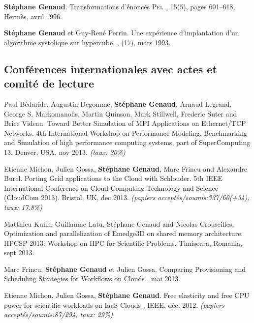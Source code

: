 \documentclass[11pt]{article}
\begin{document}
\begin{thebibliography}{99}
\textbf{Stéphane Genaud}.
\newblock Transformations d'énoncés \textsc{Pei}.
, 15(5), pages 601--618, 
Hermès, avril 1996.

\textbf{Stéphane Genaud} et Guy-René Perrin.
\newblock Une expérience d'implantation d'un algorithme systolique sur
  hypercube.
,
  (17), mars 1993.


\subsection*{Conférences internationales avec actes et comité de lecture}


  Paul  Bédaride,  Augustin Degomme,  \textbf{Stéphane  Genaud},
  Arnaud  Legrand,  George  S.  Markomanolis, Martin  Quinson,  Mark  Stillwell,
  Frederic Suter  and Brice Videau.   
\newblock Toward Better Simulation  of MPI
  Applications on  Ethernet/TCP Networks.  
\newblock 4th  International Workshop
  on  Performance  Modeling, Benchmarking  and  Simulation  of high  performance
  computing  systems,  part  of  SuperComputing   13.  Denver,  USA,  nov  2013.
\newblock \small{\textit{(taux: 30\%)}}

Etienne Michon, Julien Gossa, \textbf{Stéphane Genaud}, Marc Frincu and Alexandre Burel.
\newblock Porting Grid applications to the Cloud with Schlouder.
\newblock 5th IEEE International Conference on Cloud Computing Technology and Science (CloudCom 2013). Bristol, UK, dec 2013.
\newblock \small{\textit{(papiers acceptés/soumis{:}337/60(+34), taux: 17.8\%)}}

Matthieu Kuhn, Guillaume Latu, Stéphane Genaud and Nicolas Crouseilles.
\newblock Optimization and parallelization of Emedge3D on shared memory architecture.
\newblock HPCSP 2013: Workshop on HPC for Scientific Problems, Timisoara, Romania, sept 2013.


Marc Frincu, \textbf{Stéphane Genaud} et Julien Gossa.
\newblock Comparing Provisioning and Scheduling Strategies for Workflows on Clouds
, mai 2013.

Etienne Michon, Julien Gossa, \textbf{Stéphane Genaud}.
\newblock Free elasticity and free CPU power for scientific workloads on IaaS Clouds
, 
IEEE, déc. 2012.
\newblock \small{\textit{(papiers acceptés/soumis:87/294, taux: 29\%)}}



\end{thebibliography}
\end{document}
